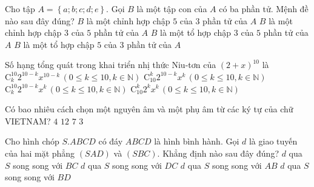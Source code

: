 \begin{ex}%
Cho tập $A=\left\{a;b;c;d;e\right\}$. Gọi $B$ là một tập con của $A$ có ba phần tử. Mệnh đề nào sau đây đúng?
\choice
{$B$ là một chỉnh hợp chập $5$ của $3$ phần tử của $A$}
{$B$ là một chỉnh hợp chập $3$ của $5$ phần tử của $A$}
{\True $B$ là một tổ hợp chập $3$ của $5$ phần tử của $A$}
{$B$ là một tổ hợp chập $5$ của $3$ phần tử của $A$}
\end{ex}

\begin{ex}%
Số hạng tổng quát trong khai triển nhị thức Niu-tơn của $\left(2+x\right)^{10}$ là
\choice
{$\mathrm{C}_k^{10} 2^{10-k} x^{10-k}\,\left(0\le k\le 10,k\in \mathbb{N}\right)$}
{\True $\mathrm{C}_{10}^k 2^{10-k}x^k\,\left(0\le k\le 10,k\in \mathbb{N}\right)$}
{$\mathrm{C}_k^{10} 2^{10-k} x^k\,\left(0\le k\le 10,k\in \mathbb{N}\right)$}
{$\mathrm{C}_{10}^k 2^k x^k\,\left(0\le k\le 10,k\in \mathbb{N}\right)$}
\end{ex}

\begin{ex}%
Có bao nhiêu cách chọn một nguyên âm và một phụ âm từ các ký tự của chữ VIETNAM?
\choice
{$4$}
{\True $12$}
{$7$}
{$3$}
\end{ex}

\begin{ex}%
Cho hình chóp $S.ABCD$ có đáy $ABCD$ là hình bình hành. Gọi $d$ là giao tuyến của hai mặt phẳng $\left(SAD\right)$ và $\left(SBC\right)$. Khẳng định nào sau đây đúng?
\choice
{\True $d$ qua $S$ song song với $BC$}
{$d$ qua $S$ song song với $DC$}
{$d$ qua $S$ song song với $AB$}
{$d$ qua $S$ song song với $BD$}
\end{ex}

